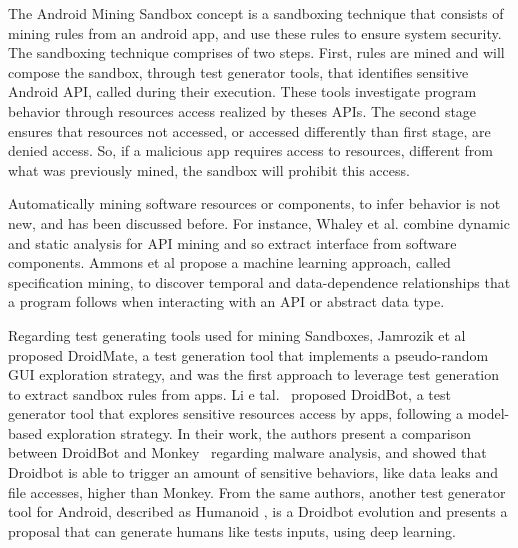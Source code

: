 
The Android Mining Sandbox concept is a sandboxing technique that consists of mining rules from an android app, and use these rules to ensure system security. The sandboxing technique comprises of two steps. First, rules are mined and will compose the sandbox,
through test generator tools, that identifies sensitive Android API, called during their execution. 
These tools investigate program behavior through resources access realized by theses APIs. The second stage ensures that resources not accessed, or accessed differently than first stage, are denied access. So, if a malicious app requires access to resources, different from what was previously mined, the sandbox will prohibit this access.

Automatically mining software resources or components, to infer behavior is not new, and has been discussed before. For instance, Whaley et al. \cite{DBLP:conf/issta/WhaleyML02} combine dynamic and static analysis for API mining and so extract interface from software components. Ammons et al \cite{DBLP:conf/popl/AmmonsBL02} propose a machine learning
approach, called specification mining, to discover temporal and data-dependence relationships that a program follows when interacting with an API or abstract data type.

Regarding test generating tools used for mining Sandboxes, Jamrozik et al \cite{DBLP:conf/icse/JamrozikZ16} proposed DroidMate, a test generation tool that implements a pseudo-random GUI exploration strategy, and was the first approach to leverage test generation to extract sandbox rules from apps. Li e tal.~\cite{DBLP:conf/icse/LiYGC17} proposed DroidBot, a test generator tool that explores sensitive resources access by apps, following a model-based exploration strategy. In their work, the authors present a comparison between DroidBot and Monkey~\cite{Monkey} regarding malware analysis, and showed that Droidbot is able to trigger an amount of sensitive behaviors, like data leaks and file accesses, higher than Monkey. From the same authors, another test generator tool for Android, described as Humanoid \cite{DBLP:conf/kbse/LiY0C19}, is a Droidbot evolution and presents a proposal that can generate humans like tests inputs, using deep learning.

